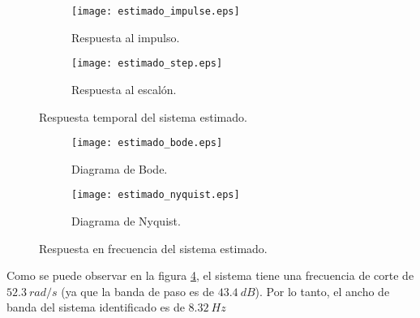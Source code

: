 \begin{figure}[H]
    \centering

    \begin{subfigure}[b]{0.49\textwidth}
        \centering
        \texttt{[image: estimado\_impulse.eps]}
        \caption{Respuesta al impulso.}
        \label{fig:estimado_impulse}
    \end{subfigure}
    \begin{subfigure}[b]{0.49\textwidth}
        \centering
        \texttt{[image: estimado\_step.eps]}
        \caption{Respuesta al escalón.}
        \label{fig:estimado_step}
    \end{subfigure}

    \vspace{-0.25cm}
    \caption{Respuesta temporal del sistema estimado.}
    \label{fig:estimado_temporal}
\end{figure}
\vspace{-0.5cm}

\begin{figure}[H]
    \centering

    \begin{subfigure}[b]{0.49\textwidth}
        \centering
        \texttt{[image: estimado\_bode.eps]}
        \caption{Diagrama de Bode.}
        \label{fig:estimado_bode}
    \end{subfigure}
    \begin{subfigure}[b]{0.49\textwidth}
        \centering
        \texttt{[image: estimado\_nyquist.eps]}
        \caption{Diagrama de Nyquist.}
        \label{fig:estimado_nyquist}
    \end{subfigure}

    \vspace{-0.25cm}
    \caption{Respuesta en frecuencia del sistema estimado.}
    \label{fig:estimado_frecuencia}
\end{figure}
\vspace{-0.5cm}

Como se puede observar en la figura \ref{fig:estimado_bode}, el sistema tiene una frecuencia de corte 
de $52.3\ rad/s$ (ya que la banda de paso es de $43.4\ dB$). Por lo tanto, el ancho de banda del sistema
identificado es de $8.32\ Hz$

